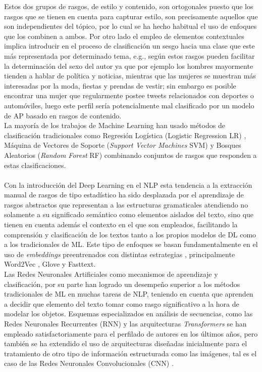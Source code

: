 Estos dos grupos de rasgos, de estilo y contenido, son ortogonales puesto que los rasgos que se tienen en cuenta para capturar estilo, son precisamente aquellos que son independientes del tópico, por lo cual se ha hecho habitual el uso de enfoques que los combinen a ambos. Por otro lado el empleo de elementos contextuales implica introducir en el proceso de clasificación un sesgo hacia una clase que este más representada por determinado tema, e.g., según \citep{schler2006effects} estos rasgos pueden facilitar la determinación del sexo del autor ya que por ejemplo los hombres mayormente tienden a hablar de política y noticias, mientras que las mujeres se muestran más interesadas por la moda, fiestas y prendas de vestir; sin embargo es posible encontrar una mujer que regularmente postee tweets relacionados con deportes o automóviles, luego este perfil sería potencialmente mal clasificado por un modelo de AP basado en rasgos de contenido.
\\
La mayoría de los trabajos de Machine Learning han usado métodos de clasificación tradicionales como Regresión Logística (Logistic Regression LR) \citep{DBLP:conf/clef/Valencia-Valencia19}, Máquina de Vectores de Soporte (\textit{Support Vector Machines} SVM) \citep{DBLP:conf/clef/Pizarro19}  y Bosques Aleatorios (\textit{Random Forest} RF) \citep{DBLP:conf/clef/Johansson19} combinando conjuntos de rasgos que responden a estas clasificaciones.
\\
\\
 Con la introducción del Deep Learning en el NLP esta tendencia a la extracción manual de rasgos de tipo estadístico ha sido desplazada por el aprendizaje de rasgos abstractos que representan a las estructuras gramaticales atendiendo no solamente a su significado semántico como elementos aislados del texto, sino que tienen en cuenta además el contexto en el que son empleados, facilitando la comprensión y clasificación de los textos tanto a los propios modelos de DL como a los tradicionales de ML. Este tipo de enfoques se basan fundamentalmente en el uso de \textit{embeddings} preentrenados con distintas estrategias \citep{DBLP:conf/clef/JooH19,DBLP:conf/clef/Lopez-Santillan19}, principalmente Word2Vec \citep{DBLP:conf/nips/MikolovSCCD13}, Glove\citep{pennington2014glove} y Fasttext\citep{bojanowski2016enriching}.
 \\
 Las Redes Neuronales Artificiales como mecanismos de aprendizaje y clasificación, por su parte han logrado un desempeño superior a los métodos tradicionales de ML en muchas tareas de NLP, teniendo en cuenta que aprenden a decidir que elemento del texto tomar como rasgo significativo a la hora de modelar los objetos. Esquemas especializados en análisis de secuencias, como las Redes Neuronales Recurrentes (RNN) \citep{DBLP:conf/clef/DiasP19,bakhteev:2020} y las arquitecturas \textit{Transformers} \citep{iyer:2020,baruah:2020} se han empleado satisfactoriamente para el perfilado de autores en los últimos años, pero también se ha extendido el uso de arquitecturas diseñadas inicialmente para el tratamiento de otro tipo de información estructurada como las imágenes, tal es el caso de las Redes Neuronales Convolucionales (CNN) \citep{DBLP:conf/clef/PetrikC19,DBLP:conf/clef/Lopez-Santillan19}.
